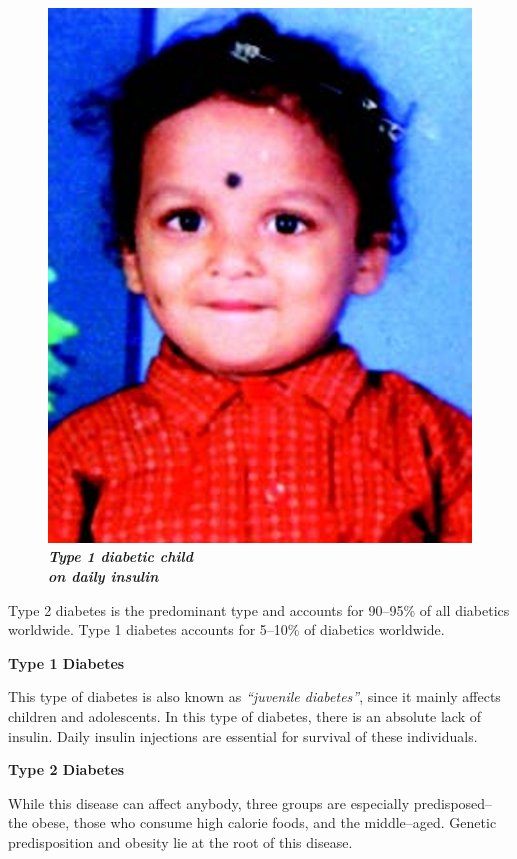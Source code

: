 \begin{figure}
\centering
\includegraphics[scale=.6]{images/024.jpg}\\
\textbf{\textit{Type 1 diabetic child\\ on daily insulin}}
\end{figure}

Type 2 diabetes is the predominant type and accounts for 90–95\% of all diabe\-tics worldwide. Type 1 diabetes accounts for 5–10\% of diabetics worldwide.

\noindent
\textbf{Type 1 Diabetes}

This type of diabetes is also known as \textit{“juvenile diabetes”}, since it mainly affects children and adolescents. In this type of diabetes, there is an absolute lack of insu\-lin. Daily insulin injections are essential for survival of these individuals.

\clearpage
\noindent
\textbf{Type 2 Diabetes}

While this disease can affect anybody, three groups are especially predisposed– the obese, those who consume high calorie foods, and the middle–aged. Genetic predisposition and obesity lie at the root of this disease.

